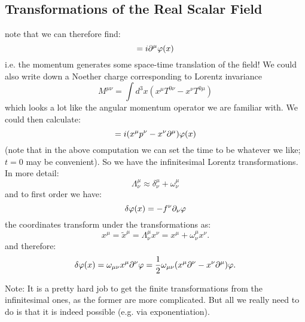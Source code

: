 \subsection{Transformations of the Real Scalar Field}
note that we can therefore find:
\begin{equation}
    [P^\mu, \varphi(x)] = i\p^\mu \varphi(x)
\end{equation}
i.e. the momentum generates some space-time translation of the field! We could also write down a Noether charge corresponding to Lorentz invariance
\begin{equation}
    M^{\mu\nu} = \int d^3x(x^\mu T^{0\nu} - x^\nu T^{0\mu})
\end{equation}
which looks a lot like the angular momentum operator we are familiar with. We could then calculate:
\begin{equation}
    [M^{\mu\nu}, \varphi(x)] = i(x^\mu p^\nu - x^\nu \p^\mu)\varphi(x)
\end{equation}
(note that in the above computation we can set the time to be whatever we like; $t=0$ may be convenient). So we have the infinitesimal Lorentz transformations. In more detail:
\begin{equation}
    \Lambda^\mu_\nu \approx \delta^\mu_\nu + \omega^\mu_\nu
\end{equation}
and to first order we have:
\begin{equation}
    \delta\varphi(x) = -f^\nu \p_\nu \varphi
\end{equation}
the coordinates transform under the transformations as:
\begin{equation}
    x^\mu = \tilde{x}^\mu = \Lambda^\mu_\nu x^\nu = x^\mu + \omega^\mu_\nu x^\nu.
\end{equation}
and therefore:
\begin{equation}
    \delta \varphi(x) = \omega_{\mu\nu}x^\mu \p^\nu \varphi = \frac{1}{2}\omega_{\mu\nu}(x^\mu\p^\nu - x^\nu \p^\mu)\varphi.
\end{equation}

Note: It is a pretty hard job to get the finite transformations from the infinitesimal ones, as the former are more complicated. But all we really need to do is that it is indeed possible (e.g. via exponentiation).


